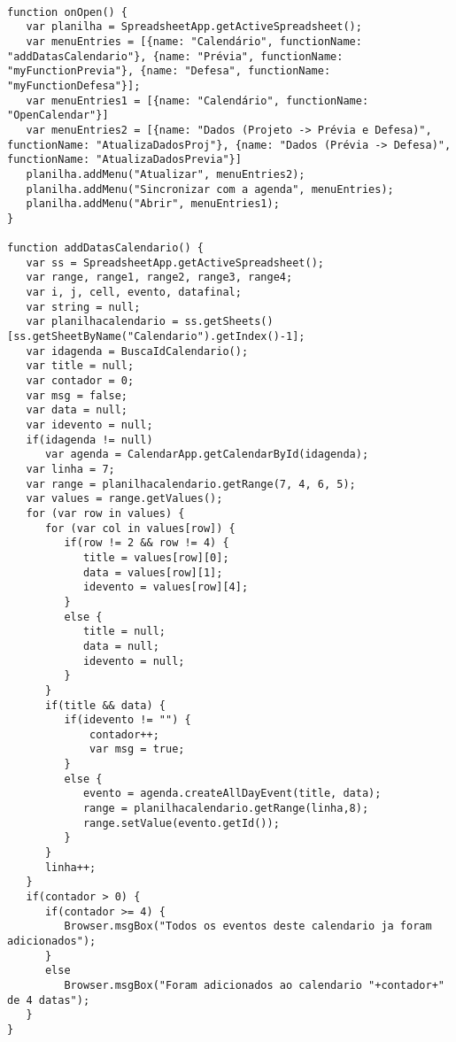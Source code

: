 \begin{lstlisting}

function onOpen() {
   var planilha = SpreadsheetApp.getActiveSpreadsheet();
   var menuEntries = [{name: "Calendário", functionName: "addDatasCalendario"}, {name: "Prévia", functionName: "myFunctionPrevia"}, {name: "Defesa", functionName: "myFunctionDefesa"}];
   var menuEntries1 = [{name: "Calendário", functionName: "OpenCalendar"}]
   var menuEntries2 = [{name: "Dados (Projeto -> Prévia e Defesa)", functionName: "AtualizaDadosProj"}, {name: "Dados (Prévia -> Defesa)", functionName: "AtualizaDadosPrevia"}]
   planilha.addMenu("Atualizar", menuEntries2);
   planilha.addMenu("Sincronizar com a agenda", menuEntries);
   planilha.addMenu("Abrir", menuEntries1);
}

function addDatasCalendario() {
   var ss = SpreadsheetApp.getActiveSpreadsheet();
   var range, range1, range2, range3, range4; 
   var i, j, cell, evento, datafinal;
   var string = null;
   var planilhacalendario = ss.getSheets()[ss.getSheetByName("Calendario").getIndex()-1];
   var idagenda = BuscaIdCalendario();
   var title = null;
   var contador = 0;
   var msg = false;
   var data = null;
   var idevento = null;
   if(idagenda != null)
      var agenda = CalendarApp.getCalendarById(idagenda);
   var linha = 7;
   var range = planilhacalendario.getRange(7, 4, 6, 5);
   var values = range.getValues();
   for (var row in values) {
      for (var col in values[row]) {
         if(row != 2 && row != 4) {
            title = values[row][0];
            data = values[row][1];
            idevento = values[row][4];
         }
         else {
            title = null;
            data = null;
            idevento = null;
         }
      }      
      if(title && data) {
         if(idevento != "") {
             contador++;
             var msg = true;
         }
         else {
            evento = agenda.createAllDayEvent(title, data);
            range = planilhacalendario.getRange(linha,8);
            range.setValue(evento.getId());
         }
      }
      linha++;
   }
   if(contador > 0) {
      if(contador >= 4) {
         Browser.msgBox("Todos os eventos deste calendario ja foram adicionados");
      }
      else 
         Browser.msgBox("Foram adicionados ao calendario "+contador+" de 4 datas");
   }
}


\end{lstlisting}

